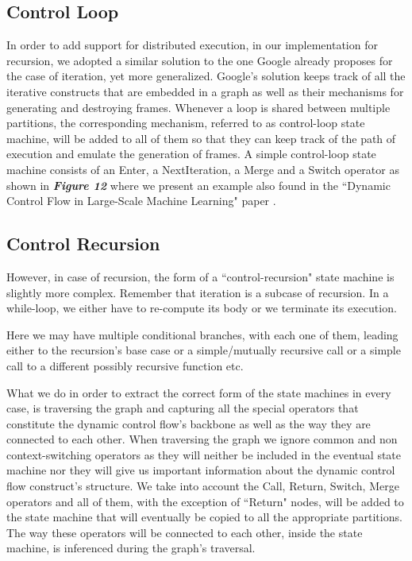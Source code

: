 \documentclass[ack,preface]{dithesis}
\begin{document}
    \subsection{Control Loop}
In order to add support for distributed execution, in our implementation for recursion, we adopted a similar solution to the one Google already proposes for the case of iteration, yet more generalized. Google's solution keeps track of all the iterative constructs that are embedded in a graph as well as their mechanisms for generating and destroying frames. Whenever a loop is shared between multiple partitions, the corresponding mechanism, referred to as control-loop state machine,  will be added to all of them so that they can keep track of the path of execution and emulate the generation of frames.
 A simple control-loop state machine consists of an Enter, a NextIteration, a Merge and a Switch operator as shown in  \textit{\textbf{Figure 12}} where we present an example also found in the ``Dynamic Control Flow in Large-Scale Machine Learning" paper \cite{Yu:2018}.

    \subsection{Control Recursion}
However, in case of recursion, the form of a ``control-recursion" state machine is slightly more complex.  Remember that iteration is a subcase of recursion. In a while-loop, we either have to re-compute its body or we terminate its execution.

Here we may have multiple conditional branches, with each one of them, leading either to the recursion's base case or a simple/mutually recursive call or a simple call to a different possibly recursive function etc. 

What we do in order to extract the correct form of the state machines in every case, is traversing the graph and capturing all the special operators that constitute the dynamic control flow's backbone as well as the way they are connected to each other. When traversing the graph we ignore common and non context-switching operators as they will neither be included in the eventual state machine nor they will give us important information about the dynamic control flow construct's structure. We take into account the Call, Return, Switch, Merge operators and all of them, with the exception of ``Return" nodes, will be added to the state machine that will eventually  be copied to all the appropriate partitions. The way these operators will be connected to each other, inside the state machine, is inferenced during the graph's traversal.
\end{document}
